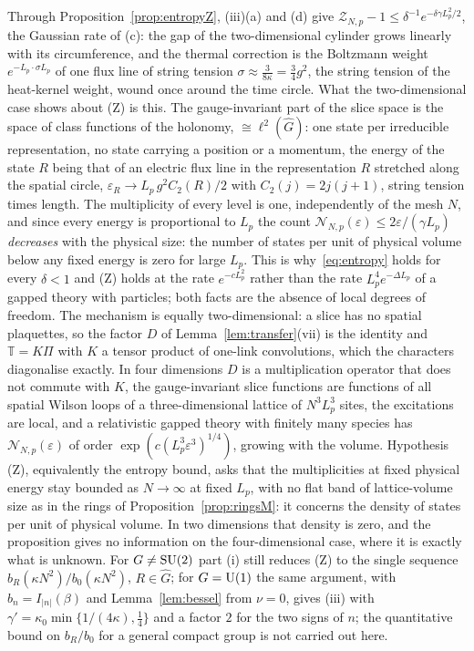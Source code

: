 Through Proposition~\ref{prop:entropyZ}, (iii)(a) and (d) give $\mathcal Z_{N,p}
-1\le\delta^{-1}e^{-\delta\gamma L_p^2/2}$, the Gaussian rate of (c): the gap
of the two-dimensional cylinder grows linearly with its circumference, and the
thermal correction is the Boltzmann weight $e^{-L_p\cdot\sigma L_p}$ of one
flux line of string tension $\sigma\approx\frac3{8\kappa}=\frac34g^2$, the
string tension of the heat-kernel weight, wound once around the time circle.
What the two-dimensional case shows about (Z) is this. The gauge-invariant
part of the slice space is the space of class functions of the holonomy,
$\cong\ell^2(\hat G)$: one state per irreducible representation, no state
carrying a position or a momentum, the energy of the state $R$ being that of
an electric flux line in the representation $R$ stretched along the spatial
circle, $\varepsilon_R\to L_p\,g^2C_2(R)/2$ with $C_2(j)=2j(j+1)$, string
tension times length. The multiplicity of every level is one, independently
of the mesh $N$, and since every energy is proportional to $L_p$ the count
$\mathcal N_{N,p}(\varepsilon)\le2\varepsilon/(\gamma L_p)$ \emph{decreases}
with the physical size: the number of states per unit of physical volume below
any fixed energy is zero for large $L_p$. This is why~\eqref{eq:entropy} holds
for every $\delta<1$ and (Z) holds at the rate $e^{-cL_p^2}$ rather than the
rate $L_p^4e^{-\Delta L_p}$ of a gapped theory with particles; both facts are
the absence of local degrees of freedom. The mechanism is equally
two-dimensional: a slice has no spatial plaquettes, so the factor $D$ of
Lemma~\ref{lem:transfer}(vii) is the identity and $\mathbb T=K\Pi$ with $K$ a
tensor product of one-link convolutions, which the characters diagonalise
exactly. In four dimensions $D$ is a multiplication operator that does not
commute with $K$, the gauge-invariant slice functions are functions of all
spatial Wilson loops of a three-dimensional lattice of $N^3L_p^3$ sites, the
excitations are local, and a relativistic gapped theory with finitely many
species has $\mathcal N_{N,p}(\varepsilon)$ of order $\exp(c(L_p^3
\varepsilon^3)^{1/4})$, growing with the volume. Hypothesis (Z), equivalently
the entropy bound, asks that the multiplicities at fixed physical energy stay
bounded as $N\to\infty$ at fixed $L_p$, with no flat band of lattice-volume
size as in the rings of Proposition~\ref{prop:ringsM}: it concerns the density
of states per unit of physical volume. In two dimensions that density is zero,
and the proposition gives no information on the four-dimensional case, where
it is exactly what is unknown. For $G\ne\mathrm{SU}(2)$ part (i) still reduces (Z) to
the single sequence $b_R(\kappa N^2)/b_0(\kappa N^2)$, $R\in\hat G$; for
$G=\mathrm{U}(1)$ the same argument, with $b_n=I_{|n|}(\beta)$ and
Lemma~\ref{lem:bessel} from $\nu=0$, gives (iii) with $\gamma'=\kappa_0\min\{
1/(4\kappa),\frac14\}$ and a factor $2$ for the two signs of $n$; the
quantitative bound on $b_R/b_0$ for a general compact group is not carried out
here.

